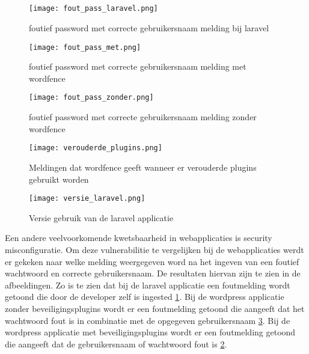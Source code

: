 \subsection{}
\begin{figure}
    \centering
    \texttt{[image: fout\_pass\_laravel.png]}
    \caption[foutief password met correcte gebruikersnaam melding bij laravel]{foutief password met correcte gebruikersnaam melding bij laravel}
    \label{fig:sec_mis_laravel}
\end{figure}
\begin{figure}
    \centering
    \texttt{[image: fout\_pass\_met.png]}
    \caption[foutief password met correcte gebruikersnaam melding met wordfence]{foutief password met correcte gebruikersnaam melding met wordfence}
    \label{fig:sec_mis_met}
\end{figure}
\begin{figure}
    \centering
    \texttt{[image: fout\_pass\_zonder.png]}
    \caption[foutief password met correcte gebruikersnaam melding zonder wordefence]{foutief password met correcte gebruikersnaam melding zonder wordfence}
    \label{fig:sec_mis_zonder}
\end{figure}
\begin{figure}
    \centering
    \texttt{[image: verouderde\_plugins.png]}
    \caption[Meldingen dat wordfence geeft wanneer er verouderde plugins gebruikt worden]{Meldingen dat wordfence geeft wanneer er verouderde plugins gebruikt worden}
    \label{fig:verouderde_plugins}
\end{figure}
\begin{figure}
    \centering
    \texttt{[image: versie\_laravel.png]}
    \caption[Versie gebruik van de laravel applicatie]{Versie gebruik van de laravel applicatie}
    \label{fig:versie_laravel}
\end{figure}
Een andere veelvoorkomende kwetsbaarheid in webapplicaties is security misconfiguratie. Om deze vulnerabilitie te vergelijken 
bij de webapplicaties werdt er gekeken naar welke melding weergegeven word na het ingeven van een foutief wachtwoord
en correcte gebruikersnaam. De resultaten hiervan zijn te zien in de afbeeldingen. Zo is te zien dat bij de laravel 
applicatie een foutmelding wordt getoond die door de developer zelf is ingested \ref{fig:sec_mis_laravel}. Bij de wordpress 
applicatie zonder beveiligingsplugins wordt er een foutmelding getoond die aangeeft dat het wachtwoord fout is in combinatie 
met de opgegeven gebruikersnaam \ref{fig:sec_mis_zonder}. Bij de wordpress applicatie met beveiligingsplugins wordt er een 
foutmelding getoond die aangeeft dat de gebruikersnaam of wachtwoord fout is \ref{fig:sec_mis_met}.

